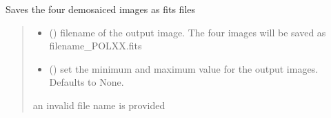 \documentclass[letterpaper,10pt,english]{sphinxmanual}
\begin{document}
\begin{fulllineitems}
\begin{fulllineitems}
\label{\detokenize{micropolarray:micropolarray.micropol_image.MicropolImage.save_demosaiced_images_as_fits}}
\pysigstartsignatures
{}
\pysigstopsignatures
\sphinxAtStartPar
Saves the four demosaiced images as fits files
\begin{quote}\begin{description}
\begin{itemize}
\item {} 
\sphinxAtStartPar
{} () \textendash{} filename of the output image. The four images will be saved as filename\_POLXX.fits

\item {} 
\sphinxAtStartPar
{} (\sphinxstyleliteralemphasis{\sphinxupquote{{[}}}\sphinxstyleliteralemphasis{\sphinxupquote{, }}\sphinxstyleliteralemphasis{\sphinxupquote{{]}}}\sphinxstyleliteralemphasis{\sphinxupquote{, }}) \textendash{} set the minimum and maximum value for the output images. Defaults to None.

\end{itemize}

\sphinxAtStartPar
{} \textendash{} an invalid file name is provided

\end{description}\end{quote}

\end{fulllineitems}



\end{fulllineitems}
\end{document}
